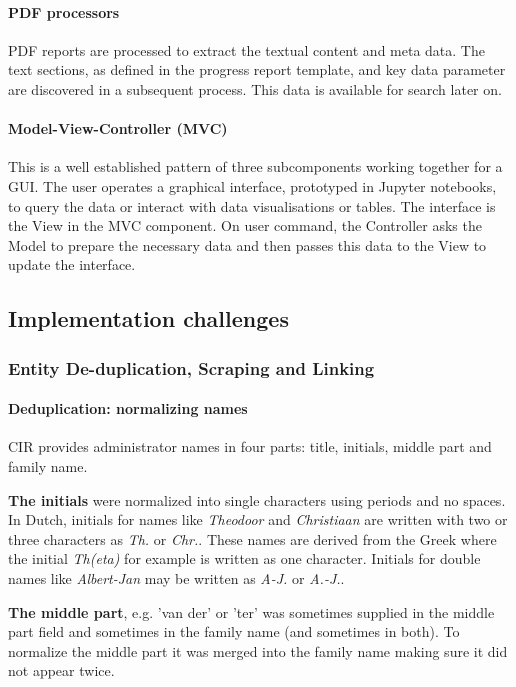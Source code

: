 \paragraph{PDF processors}
PDF reports are processed to extract the textual content and meta data. The text sections, as defined in the progress report template, and key data parameter are discovered in a subsequent process. This data is available for search later on.

\paragraph{Model-View-Controller (MVC)}
This is a well established pattern of three subcomponents working together for a GUI. The user operates a graphical interface, prototyped in Jupyter notebooks, to query the data or interact with data visualisations or tables. The interface is the View in the MVC component. On user command, the Controller asks the Model to prepare the necessary data and then passes this data to the View to update the interface.


\subsection{Implementation challenges}
\subsubsection{Entity De-duplication, Scraping and Linking}
\paragraph{Deduplication: normalizing names}
CIR provides administrator names in four parts: title, initials, middle part and family name. 

\textbf{The initials} were normalized into single characters using periods and no spaces. In Dutch, initials for names like \textit{Theodoor} and \textit{Christiaan} are written with two or three characters as \textit{Th.} or \textit{Chr.}. These names are derived from the Greek where the initial \textit{Th(eta)} for example is written as one character. Initials for double names like \textit{Albert-Jan} may be written as \textit{A-J.} or \textit{A.-J.}. 

\textbf{The middle part}, e.g. 'van der' or 'ter' was sometimes supplied in the middle part field and sometimes in the family name (and sometimes in both). To normalize the middle part it was merged into the family name making sure it did not appear twice.

